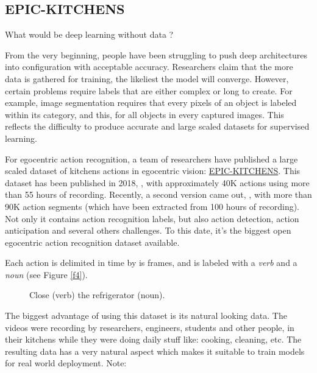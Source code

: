 \documentclass[12pt, a4paper]{report}
\begin{document}
			\subsection{EPIC-KITCHENS}
				What would be deep learning without data ?\par
				From the very beginning, people have been struggling to push deep architectures into configuration with acceptable accuracy.
				Researchers claim that the more data is gathered for training, the likeliest the model will converge.
				However, certain problems require labels that are either complex or long to create.
				For example, image segmentation requires that every pixels of an object is labeled within its category, and this, for all objects in every captured images.
				This reflects the difficulty to produce accurate and large scaled datasets for supervised learning.\par
				For egocentric action recognition, a team of researchers have published a large scaled dataset of kitchens actions in egocentric vision: \href{https://epic-kitchens.github.io/2021}{EPIC-KITCHENS}.
				This dataset has been published in 2018, \cite{damen_18}, with approximately 40K actions using more than 55 hours of recording.
				Recently, a second version came out, \cite{damen_20}, with more than 90K action segments (which have been extracted from 100 hours of recording).
				Not only it contains action recognition labels, but also action detection, action anticipation and several others challenges.
				To this date, it's the biggest open egocentric action recognition dataset available.\par
				Each action is delimited in time by is frames, and is labeled with a {\itshape verb} and a {\itshape noun} (see Figure \ref{f4}).
				\begin{figure}[!h]
					\centering
					\caption{Close ({\small verb}) the refrigerator ({\small noun}).}
				\end{figure}
				The biggest advantage of using this dataset is its natural looking data.
				The videos were recording by researchers, engineers, students and other people, in their kitchens while they were doing daily stuff like: cooking, cleaning, etc.
				The resulting data has a very natural aspect which makes it suitable to train models for real world deployment.
				Note: %
\end{document}
